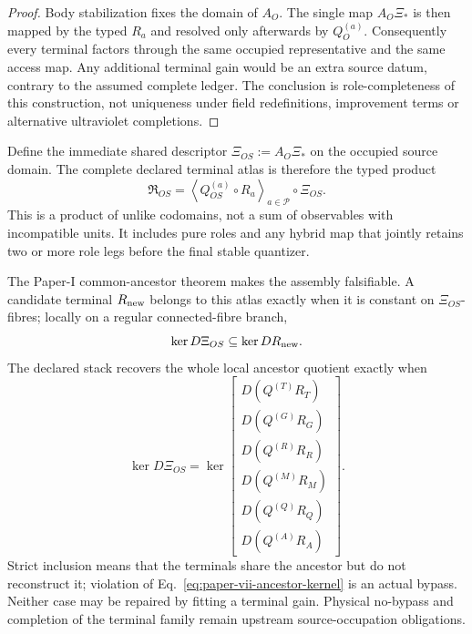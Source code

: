 \begin{proof}
Body stabilization fixes the domain of $A_O$.  The single map $A_O\Xi_*$ is
then mapped by the typed $R_a$ and resolved only afterwards by
$Q_O^{(a)}$.  Consequently every terminal factors through the same occupied
representative and the same access map.  Any additional terminal gain would
be an extra source datum, contrary to the assumed complete ledger.  The
conclusion is role-completeness of this construction, not uniqueness under
field redefinitions, improvement terms or alternative ultraviolet
completions.
\end{proof}

Define the immediate shared descriptor
\(\Xi_{OS}:=A_O\Xi_*\) on the occupied source domain.  The complete declared
terminal atlas is therefore the typed product
\begin{equation}
 \mathfrak R_{OS}
 =
 \left\langle Q_{OS}^{(a)}\circ R_a
 \right\rangle_{a\in\mathcal P}
 \circ\Xi_{OS}.
 \label{eq:paper-vii-unified-terminal-atlas}
\end{equation}
This is a product of unlike codomains, not a sum of observables with
incompatible units.  It includes pure roles and any hybrid map that jointly
retains two or more role legs before the final stable quantizer.

The Paper-I common-ancestor theorem makes the assembly falsifiable.  A
candidate terminal \(R_{\rm new}\) belongs to this atlas exactly when it is
constant on \(\Xi_{OS}\)-fibres; locally on a regular connected-fibre branch,
\begin{equation}
 \ker D\Xi_{OS}\subseteq\ker DR_{\rm new}.
 \label{eq:paper-vii-ancestor-kernel}
\end{equation}
The declared stack recovers the whole local ancestor quotient exactly when
\begin{equation}
 \ker D\Xi_{OS}
 =
 \ker
 \begin{bmatrix}
  D(Q^{(T)}R_T)\\
  D(Q^{(G)}R_G)\\
  D(Q^{(R)}R_R)\\
  D(Q^{(M)}R_M)\\
  D(Q^{(Q)}R_Q)\\
  D(Q^{(A)}R_A)
 \end{bmatrix}.
 \label{eq:paper-vii-ancestor-completeness}
\end{equation}
Strict inclusion means that the terminals share the ancestor but do not
reconstruct it; violation of Eq.~\eqref{eq:paper-vii-ancestor-kernel} is an
actual bypass.  Neither case may be repaired by fitting a terminal gain.
Physical no-bypass and completion of the terminal family remain upstream
source-occupation obligations.

